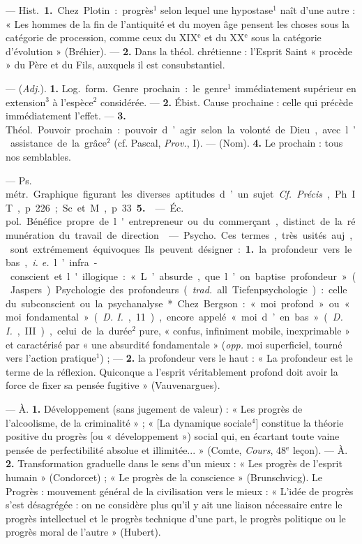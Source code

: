 \begin{itemize}[leftmargin=1cm, label=, itemsep=1pt]
 — \si{Hist.} {\bf 1.} Chez Plotin :
progrès$^1$ selon lequel une hypostase$^1$
naît d’une autre : « Les hommes
de la fin de l'antiquité et du moyen
âge pensent les choses sous la catégorie
de procession, comme ceux
du {\footnotesize XIX}$^\text{e}$ et du {\footnotesize XX}$^\text{e}$ sous la catégorie
d'évolution » (Bréhier). — {\bf 2.} Dans
la théol. chrétienne : l'Esprit Saint
« procède » du Père et du Fils, auxquels il est consubstantiel.

 — ({\it Adj.}). {\bf 1.} \si{Log.} \si{form.}
Genre prochain : le genre$^1$ immédiatement supérieur en extension$^3$
à l'espèce$^2$ considérée. — {\bf 2.} Ébist.
Cause prochaine : celle qui précède
immédiatement l'effet. — {\bf 3.} \si{Théol.}
Pouvoir prochain : pouvoir d’agir
selon la volonté de Dieu, avec l’assistance de la grâce$^2$ (cf. Pascal, {\it Prov.},
I). — (Nom). {\bf 4.} Le prochain : tous
nos semblables.

 — \si{Ps. métr.} Graphique figurant les diverses aptitudes d’un sujet. {\it Cf.} {\it Précis}, Ph. IT,
p. 226 ; Sc. et M., p. 33 {\bf 5.}

 — \si{Éc. pol.} Bénéfice propre de
l'entrepreneur ou du commerçant,
distinct de la rémunération du travail de direction.

 — \si{Psycho.} Ces
termes, très usités auj., sont extrémement équivoques. Ils peuvent
désigner : {\bf 1.} la profondeur vers le
bas, {\it i. e.} l’infra-conscient et l'illogique : « L’absurde, que l’on baptise
profondeur » (Jaspers). Psychologie
des profondeurs ({\it trad.} all. Tiefenpsychologie) : celle du subconscient
ou la psychanalyse*. Chez Bergson :
« moi profond » ou « moi fondamental » ({\it D. I.}, 11), encore appelé « moi
d’en bas » ({\it D. I.}, III), celui de la
durée$^2$ pure, « confus, infiniment
mobile, inexprimable » et caractérisé par « une absurdité fondamentale » ({\it opp.} moi superficiel, tourné
vers l’action pratique$^1$) ; — {\bf 2.} la profondeur vers le haut : « La profondeur est le terme de la réflexion.
Quiconque a l'esprit véritablement
profond doit avoir la force de fixer
sa pensée fugitive » (Vauvenargues).

 — À. {\bf 1.} Développement (sans
jugement de valeur) : « Les progrès
de l'alcoolisme, de la criminalité » ;
« [La dynamique sociale$^4$] constitue
la théorie positive du progrès [ou
« développement ») social qui, en
écartant toute vaine pensée de perfectibilité absolue et illimitée... »
(Comte, {\it Cours}, 48$^\text{e}$ leçon). — À. {\bf 2.}
Transformation graduelle dans le
sens d'un mieux : « Les progrès de
l'esprit humain » (Condorcet) ; « Le
progrès de la conscience » (Brunschvicg). Le Progrès : mouvement général de la civilisation vers le mieux :
« L'idée de progrès s’est désagrégée :
on ne considère plus qu'il y ait une
liaison nécessaire entre le progrès
intellectuel et le progrès technique
d'une part, le progrès politique ou
le progrès moral de l’autre » (Hubert).


\end{itemize}
